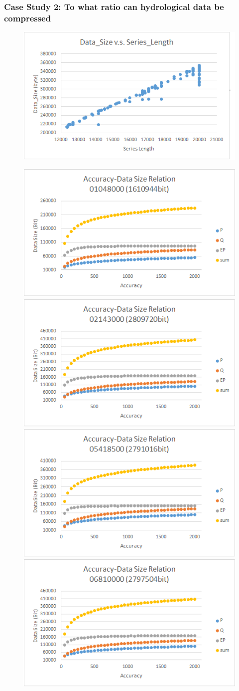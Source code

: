 \documentclass{beamer}
\begin{document}
\begin{CJK}{UTF8}{gkai}
 
\begin{frame}
\frametitle{Case Study 2: To what ratio can hydrological data be compressed}
\begin{figure}[H]\centering
\includegraphics[width=.24\textwidth]{datasize.png}
\end{figure}
\begin{figure}[H]\centering
\includegraphics[width=.26\textwidth]{01048000.png}
\includegraphics[width=.26\textwidth]{02143000.png}
\includegraphics[width=.26\textwidth]{05418500.png}
\includegraphics[width=.26\textwidth]{06810000.png}
\end{figure}  
\end{frame} 


\end{CJK}
\end{document}
